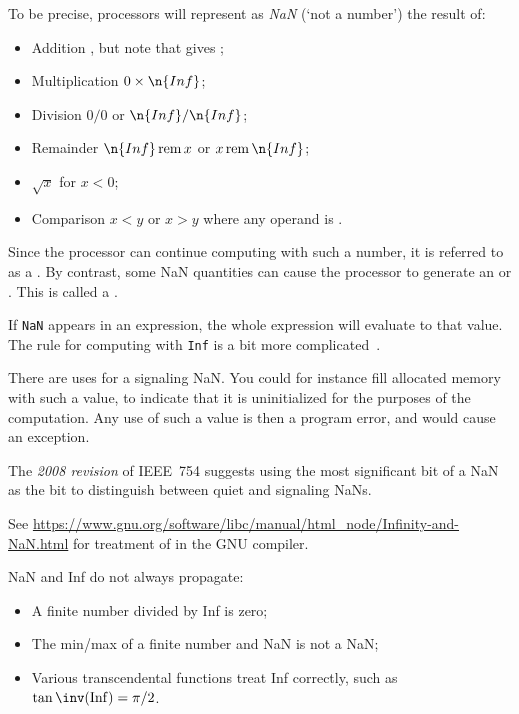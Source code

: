 To be precise,
processors will represent as \emph{NaN} 
(`not a number')
the result of:

\begin{itemize}
\item Addition , but note that  gives ;
\item Multiplication $0\times\n{Inf}$;
\item Division $0/0$ or $\n{Inf}/\n{Inf}$;
\item Remainder $\n{Inf}\mathop{\mathrm{rem}} x$ or
  $x\mathop{\mathrm{rem}} \n{Inf}$;
\item $\sqrt{x}$ for $x<0$;
\item Comparison $x<y$ or $x>y$ where any operand is .
\end{itemize}

Since the processor can continue computing with such a number, it is
referred to as a . By contrast, some NaN
quantities can cause the processor to generate an
 or . This is called a
. 

If \texttt{NaN} appears in an
expression, the whole expression will evaluate to that value. The rule
for computing with \texttt{Inf} is a bit more
complicated~\cite{goldberg:floatingpoint}.

There are uses for a signaling NaN. You could for instance fill
allocated memory with such a value, to indicate that it is
uninitialized for the purposes of the computation. Any use of such a
value is then a program error, and would cause an exception.

The \emph{2008 revision}%
 of IEEE~754 suggests using the most
significant bit of a NaN as the  bit to distinguish
between quiet and signaling NaNs.

See \url{https://www.gnu.org/software/libc/manual/html_node/Infinity-and-NaN.html}
for treatment of  in the GNU compiler.

\begin{remark}
  NaN and Inf do not always propagate:
  \begin{itemize}
  \item A finite number divided by Inf is zero;
  \item The min/max of a finite number and NaN is not a NaN;
  \item Various transcendental functions treat Inf correctly,
    such as $\tan\inv(\mathrm{Inf})=\pi/2$.
  \end{itemize}
\end{remark}

